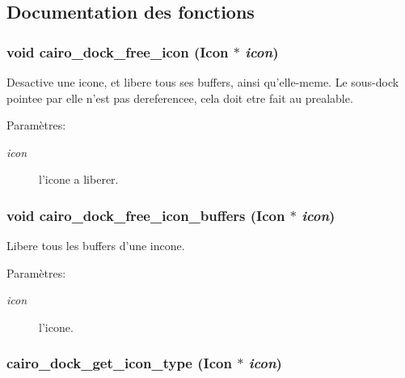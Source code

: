 \subsection{Documentation des fonctions}
\subsubsection{\setlength{\rightskip}{0pt plus 5cm}void cairo\_\-dock\_\-free\_\-icon ({\bf Icon} $\ast$ {\em icon})}\label{cairo-dock-icons_8h_f54199a4215a71f8b017ceb6512366f9}


Desactive une icone, et libere tous ses buffers, ainsi qu'elle-meme. Le sous-dock pointee par elle n'est pas dereferencee, cela doit etre fait au prealable. \begin{Desc}
\item[Paramètres:]
\begin{description}
\item[{\em icon}]l'icone a liberer. \end{description}
\end{Desc}
\subsubsection{\setlength{\rightskip}{0pt plus 5cm}void cairo\_\-dock\_\-free\_\-icon\_\-buffers ({\bf Icon} $\ast$ {\em icon})}\label{cairo-dock-icons_8h_51da2563344e8d90fb9c36185c77e715}


Libere tous les buffers d'une incone. \begin{Desc}
\item[Paramètres:]
\begin{description}
\item[{\em icon}]l'icone. \end{description}
\end{Desc}
\subsubsection{ cairo\_\-dock\_\-get\_\-icon\_\-type ({\bf Icon} $\ast$ {\em icon})}\label{cairo-dock-icons_8h_efe65917a776a2275bd6aac778c6708b}


